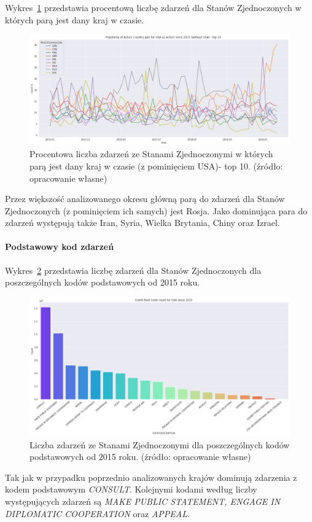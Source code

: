 \documentclass[11pt]{report}
\begin{document}
    Wykres~\ref{fig:USApairPerc} przedstawia procentową liczbę zdarzeń dla Stanów Zjednoczonych w których parą jest dany kraj w czasie.
    \begin{figure}[!htp]
        \centering
        \includegraphics[width=\linewidth]{fig/USA/USAactor2PairPercinTIME.png}
        \caption{Procentowa liczba zdarzeń ze Stanami Zjednoczonymi w których parą jest dany kraj w czasie (z pominięciem USA)- top 10. (źródło: opracowanie własne)}
        \label{fig:USApairPerc}
    \end{figure}
    Przez większość analizowanego okresu główną parą do zdarzeń dla Stanów Zjednoczonych (z pominięciem ich samych) jest Rosja.
    Jako dominująca para do zdarzeń występują także Iran, Syria, Wielka Brytania, Chiny oraz Izrael.

    \paragraph{Podstawowy kod zdarzeń}

    Wykres~\ref{fig:USAPERC} przedstawia liczbę zdarzeń dla Stanów Zjednoczonych dla poszczególnych kodów podstawowych od 2015 roku.

    \begin{figure}[!htp]
        \centering
        \includegraphics[width=\linewidth]{fig/USA/USAERC.png}
        \caption{Liczba zdarzeń ze Stanami Zjednoczonymi dla poszczególnych kodów podstawowych od 2015 roku. (źródło: opracowanie własne)}
        \label{fig:USAPERC}
    \end{figure}
    Tak jak w przypadku poprzednio analizowanych krajów dominują zdarzenia z kodem podstawowym \textit{CONSULT}.
    Kolejnymi kodami według liczby występujących zdarzeń są \textit{MAKE PUBLIC STATEMENT, ENGAGE IN DIPLOMATIC COOPERATION} oraz \textit{APPEAL}.
\end{document}
